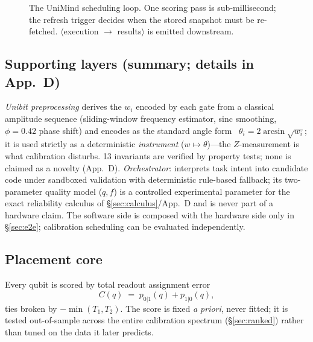 \documentclass[journal,10pt,twocolumn]{IEEEtran}
\begin{document}
\begin{figure}[t]
\centering
{}
\caption{The UniMind scheduling loop. One scoring pass is sub-millisecond; the refresh trigger decides when the
stored snapshot must be re-fetched. $\langle$execution $\to$ results$\rangle$ is emitted downstream.}
\label{fig:loop}
\end{figure}

\subsection{Supporting layers (summary; details in App.~D)}
\emph{Unibit preprocessing} derives the $w_i$ encoded by each gate from a classical amplitude sequence
(sliding-window frequency estimator, sinc smoothing, $\phi{=}0.42$ phase shift) and encodes as the standard
angle form~\cite{schuld2018,hhavlicek2019} $\theta_i{=}2\arcsin\sqrt{w_i}$; it is used strictly as a deterministic
\emph{instrument} ($w\mapsto\theta$)---the $Z$-measurement is what calibration disturbs. 13 invariants are
verified by property tests; none is claimed as a novelty (App.~D).
\emph{Orchestrator}: interprets task intent into candidate code under sandboxed validation with deterministic
rule-based fallback; its two-parameter quality model ($q,f$) is a controlled experimental parameter for the
exact reliability calculus of \S\ref{sec:calculus}/App.~D and is never part of a hardware claim. The software
side is composed with the hardware side only in \S\ref{sec:e2e}; calibration scheduling can be evaluated
independently.

\subsection{Placement core}
\label{sec:score}
Every qubit is scored by total readout assignment error
\begin{equation}
C(q)\;=\;p_{0|1}(q)+p_{1|0}(q),
\label{eq:cscore}
\end{equation}
ties broken by $-\min(T_1,T_2)$. The score is fixed \emph{a priori}, never fitted; it is tested out-of-sample
across the entire calibration spectrum (\S\ref{sec:ranked}) rather than tuned on the data it later predicts.
\end{document}
